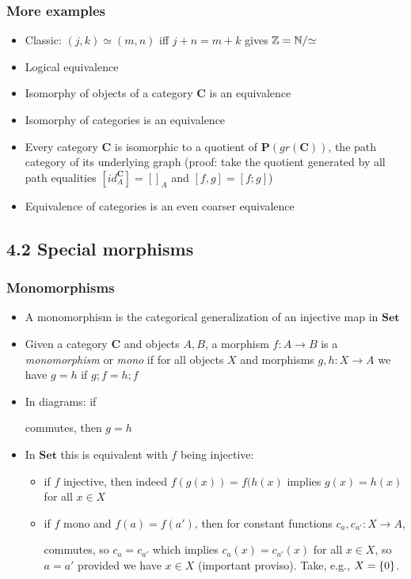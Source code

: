 \documentclass[handout]{beamer}
\newcommand{\bfsf}[1]{{\boldsymbol{#1}}}
\newcommand{\Set}{\bfsf{Set}}
\newcommand{\CC}{\bfsf{C}}
\newcommand{\PP}{\bfsf{P}}
\begin{document}
\frame
  {   
    \frametitle{More examples}\label{Ch4:EqMorExa}

 \begin{itemize}[<+->]
\item Classic: $(j,k)\simeq(m,n)$ iff $j+n = m+k$ gives $\mathbb{Z}=\mathbb{N}/{\simeq}$
\item Logical equivalence
\item Isomorphy of objects of a category $\CC$ is an equivalence
\item Isomorphy of categories is an equivalence
\item Every category $\CC$ is isomorphic to a quotient of $\PP(gr(\CC))$,
the path category of its underlying graph (proof: take the quotient generated
by all path equalities $[id^\CC_A]=[]_A$ and $[f,g] = [f;g]$)
\item Equivalence of categories is an even coarser equivalence
 \end{itemize}

 }

\subsection{4.2 Special morphisms}
 
\frame
  {   
    \frametitle{Monomorphisms}\label{Ch4:Monos}

 \begin{itemize}[<+->]
\item A monomorphism is the categorical generalization of an injective map in $\Set$
\item Given a category $\CC$ and objects $A,B$, a morphism $f: A\to B$ is a
\emph{monomorphism} or \emph{mono} if for all objects $X$ and 
morphisms $g,h: X\to A$ we have $g=h$ if $g;f = h;f$ %
\item In diagrams: if
 commutes, then $g=h$
\item In $\Set$ this is equivalent with $f$ being injective:
 \begin{itemize}
    \item if $f$ injective, then indeed $f(g(x))=f(h(x)$ implies $g(x)=h(x)$ for all $x\in X$
    \item if $f$ mono and $f(a)=f(a')$, then 
for constant functions $c_a,c_{a'} : X\to A$,
commutes, so $c_{a}=c_{a'}$ which implies $c_{a}(x)=c_{a'}(x)$ for all $x\in X$, so $a=a'$
{\color{red}provided we have $x\in X $ (important proviso)}. Take, e.g., $X=\{0\}$.
\end{itemize}
 \end{itemize}

 }
\end{document}
